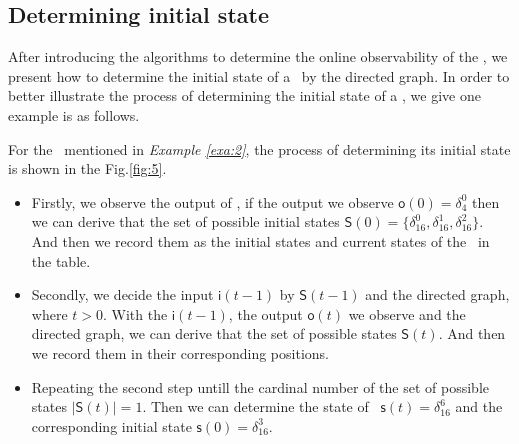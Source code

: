 \subsection{Determining initial state}

After introducing the algorithms to determine the online observability of the \BCNs, we present how to determine the initial state of a \BCN\ by the directed graph. In order to better illustrate the process of determining the initial state of a \BCN, we give one example is as follows.
\begin{example}
For the \BCN\ mentioned in {\em Example \ref{exa:2}}, the process of determining its initial state is shown in the Fig.\ref{fig:5}. 
\begin{itemize}
  \item Firstly, we observe the output of \BCN, if the output we observe $\mathsf{o}(0)=\delta_4^0$ then we can derive that the set of possible initial states $\mathsf{S}(0)=\{\delta_{16}^0,\delta_{16}^1,\delta_{16}^2\}$. And then we record them as the initial states and current states of the \BCN\ in the table. 
  \item Secondly, we decide the input $\mathsf{i}(t-1)$ by $\mathsf{S}(t-1)$ and the directed graph, where $t>0$. With the $\mathsf{i}(t-1)$, the output $\mathsf{o}(t)$ we observe and the directed graph, we can derive that the set of possible states $\mathsf{S}(t)$. And then we record them in their corresponding positions. 
 \item Repeating the second step untill the cardinal number of the set of possible states $|\mathsf{S}(t)|=1$. Then we can determine the state of \BCN\ $\mathsf{s}(t)=\delta_{16}^{6}$ and the corresponding initial state $\mathsf{s}(0)=\delta_{16}^{3}$.
\end{itemize} 
\end{example}   

